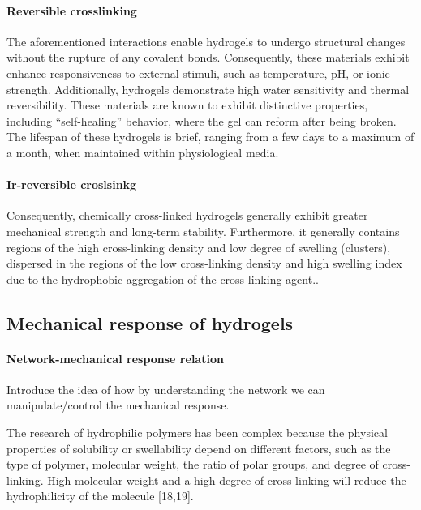 \paragraph{Reversible crosslinking}
The aforementioned interactions enable hydrogels to undergo structural changes without the rupture of any covalent bonds. 
Consequently, these materials exhibit enhance responsiveness to external stimuli, such as temperature, pH, or ionic strength. 
Additionally, hydrogels demonstrate high water sensitivity and thermal reversibility\citep{bustamante-torresHydrogelsClassificationAccording2021,priyaComprehensiveReviewHydrogel2024}.
These materials are known to exhibit distinctive properties, including ``self-healing'' behavior, where the gel can reform after being broken.
The lifespan of these hydrogels is brief, ranging from a few days to a maximum of a month, when maintained within physiological media.


\paragraph{Ir-reversible croslsinkg}
Consequently, chemically cross-linked hydrogels generally exhibit greater mechanical strength and long-term stability.  
Furthermore, it generally contains regions of the high cross-linking density and low degree of swelling (clusters), dispersed in the regions of the low cross-linking density and high swelling index due to the hydrophobic aggregation of the cross-linking agent\citep{bustamante-torresHydrogelsClassificationAccording2021}.. 



\subsection{Mechanical response of hydrogels}\label{ch1:Cross-linking}

\paragraph{Network-mechanical response relation} Introduce the idea of how by understanding the network we can manipulate/control the mechanical response.

The research of hydrophilic polymers has been complex because the physical properties of solubility or swellability depend on different factors, such as the type of polymer, molecular weight, the ratio of polar groups, and degree of cross-linking\citep{bustamante-torresHydrogelsClassificationAccording2021}.
High molecular weight and a high degree of cross-linking will reduce the hydrophilicity of the molecule [18,19]\citep{bustamante-torresHydrogelsClassificationAccording2021}. 



